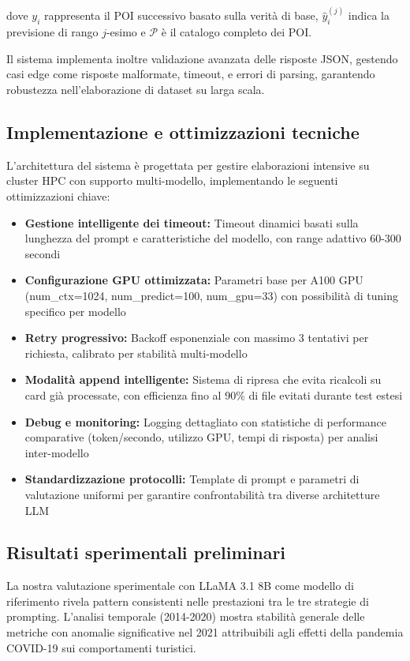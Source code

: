 \begin{itemize}
dove $y_i$ rappresenta il POI successivo basato sulla verità di base, $\hat{y}_i^{(j)}$ indica la previsione di rango $j$-esimo e $\mathcal{P}$ è il catalogo completo dei POI.

Il sistema implementa inoltre validazione avanzata delle risposte JSON, gestendo casi edge come risposte malformate, timeout, e errori di parsing, garantendo robustezza nell'elaborazione di dataset su larga scala.

\subsection{Implementazione e ottimizzazioni tecniche}

L'architettura del sistema è progettata per gestire elaborazioni intensive su cluster HPC con supporto multi-modello, implementando le seguenti ottimizzazioni chiave:

\begin{itemize}
\item \textbf{Gestione intelligente dei timeout:} Timeout dinamici basati sulla lunghezza del prompt e caratteristiche del modello, con range adattivo 60-300 secondi
\item \textbf{Configurazione GPU ottimizzata:} Parametri base per A100 GPU (num\_ctx=1024, num\_predict=100, num\_gpu=33) con possibilità di tuning specifico per modello
\item \textbf{Retry progressivo:} Backoff esponenziale con massimo 3 tentativi per richiesta, calibrato per stabilità multi-modello
\item \textbf{Modalità append intelligente:} Sistema di ripresa che evita ricalcoli su card già processate, con efficienza fino al 90\% di file evitati durante test estesi
\item \textbf{Debug e monitoring:} Logging dettagliato con statistiche di performance comparative (token/secondo, utilizzo GPU, tempi di risposta) per analisi inter-modello
\item \textbf{Standardizzazione protocolli:} Template di prompt e parametri di valutazione uniformi per garantire confrontabilità tra diverse architetture LLM
\end{itemize}

\subsection{Risultati sperimentali preliminari}

La nostra valutazione sperimentale con LLaMA 3.1 8B come modello di riferimento rivela pattern consistenti nelle prestazioni tra le tre strategie di prompting. L'analisi temporale (2014-2020) mostra stabilità generale delle metriche con anomalie significative nel 2021 attribuibili agli effetti della pandemia COVID-19 sui comportamenti turistici.


\end{itemize}
